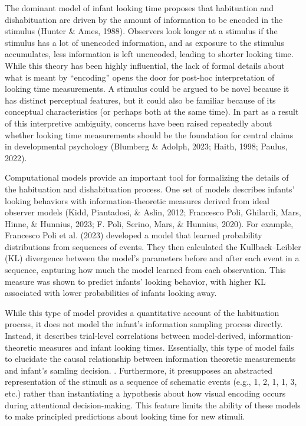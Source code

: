 \documentclass[10pt, letterpaper]{article}
\begin{document}
The dominant model of infant looking time proposes that habituation and
dishabituation are driven by the amount of information to be encoded in
the stimulus (Hunter \& Ames, 1988). Observers look longer at a stimulus
if the stimulus has a lot of unencoded information, and as exposure to
the stimulus accumulates, less information is left unencoded, leading to
shorter looking time. While this theory has been highly influential, the
lack of formal details about what is meant by ``encoding'' opens the
door for post-hoc interpretation of looking time measurements. A
stimulus could be argued to be novel because it has distinct perceptual
features, but it could also be familiar because of its conceptual
characteristics (or perhaps both at the same time). In part as a result
of this interpretive ambiguity, concerns have been raised repeatedly
about whether looking time measurements should be the foundation for
central claims in developmental psychology (Blumberg \& Adolph, 2023;
Haith, 1998; Paulus, 2022).

Computational models provide an important tool for formalizing the
details of the habituation and dishabituation process. One set of models
describes infants' looking behaviors with information-theoretic measures
derived from ideal observer models (Kidd, Piantadosi, \& Aslin, 2012;
Francesco Poli, Ghilardi, Mars, Hinne, \& Hunnius, 2023; F. Poli,
Serino, Mars, \& Hunnius, 2020). For example, Francesco Poli et al.
(2023) developed a model that learned probability distributions from
sequences of events. They then calculated the Kullback--Leibler (KL)
divergence between the model's parameters before and after each event in
a sequence, capturing how much the model learned from each observation.
This measure was shown to predict infants' looking behavior, with higher
KL associated with lower probabilities of infants looking away.

While this type of model provides a quantitative account of the
habituation process, it does not model the infant's information sampling
process directly. Instead, it describes trial-level correlations between
model-derived, information-theoretic measures and infant looking times.
Essentially, this type of model fails to elucidate the causal
relationship between information theoretic measurements and infant's
samling decision. . Furthermore, it presupposes an abstracted
representation of the stimuli as a sequence of schematic events (e.g.,
1, 2, 1, 1, 3, etc.) rather than instantiating a hypothesis about how
visual encoding occurs during attentional decision-making. This feature
limits the ability of these models to make principled predictions about
looking time for new stimuli.
\end{document}
